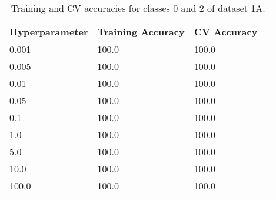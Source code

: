 \def\arraystretch{1.25}
\begin{table}[H]
{\small
\centering
\begin{tabular}{l l l c}
\hline
\hline
\textbf{Hyperparameter} & \textbf{Training Accuracy}  &  \textbf{CV Accuracy}\\
\hline
\hline
0.001 & 100.0 & 100.0\\
0.005 & 100.0 & 100.0\\
0.01 & 100.0 & 100.0\\
0.05 & 100.0 & 100.0\\
0.1 & 100.0 & 100.0\\
1.0 & 100.0 & 100.0\\
5.0 & 100.0 & 100.0\\
10.0 & 100.0 & 100.0\\
100.0 & 100.0 & 100.0\\
\hline
\end{tabular}

\caption{Training and CV accuracies for classes 0 and 2 of dataset 1A.}
}
\end{table}